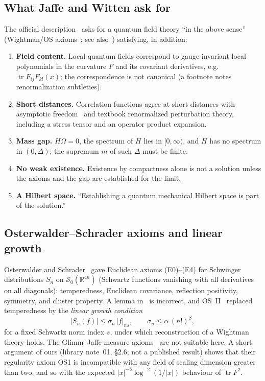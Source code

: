 \documentclass[11pt]{article}
\theoremstyle{definition}
\theoremstyle{remark}
\newcommand{\R}{\mathbb{R}}
\newcommand{\Sch}{\mathcal{S}}
\newcommand{\tr}{\operatorname{tr}}
\begin{document}
\subsection{What Jaffe and Witten ask for}
The official description~\cite{Jaffe2000} asks for a quantum field theory ``in the above sense''
(Wightman/OS axioms~\cite{Streater1964,Osterwalder1973,Osterwalder1975}; see
also~\cite{Glimm1987,Haag1996}) satisfying, in addition:
\begin{enumerate}[leftmargin=*]
\item \textbf{Field content.} Local quantum fields correspond to gauge-invariant local polynomials
  in the curvature $F$ and its covariant derivatives, e.g.\ $\tr F_{ij}F_{kl}(x)$; the
  correspondence is not canonical (a footnote notes renormalization subtleties).
\item \textbf{Short distances.} Correlation functions agree at short distances with asymptotic
  freedom~\cite{Gross1973,Politzer1973} and textbook renormalized perturbation theory, including
  a stress tensor and an operator product expansion.
\item \textbf{Mass gap.} $H\Omega=0$, the spectrum of $H$ lies in $[0,\infty)$, and $H$ has no
  spectrum in $(0,\Delta)$; the supremum $m$ of such $\Delta$ must be finite.
\item \textbf{No weak existence.} Existence by compactness alone is not a solution unless the
  axioms and the gap are established for the limit.
\item \textbf{A Hilbert space.} ``Establishing a quantum mechanical Hilbert space is part of the
  solution.''
\end{enumerate}

\subsection{Osterwalder--Schrader axioms and linear growth}
Osterwalder and Schrader~\cite{Osterwalder1973} gave Euclidean axioms (E0)--(E4) for Schwinger
distributions $S_n$ on $\Sch_0(\R^{4n})$ (Schwartz functions vanishing with all derivatives on
all diagonals): temperedness, Euclidean covariance, reflection positivity, symmetry, and cluster
property. A lemma in~\cite{Osterwalder1973} is incorrect, and OS~II~\cite{Osterwalder1975}
replaced temperedness by the \emph{linear growth condition}
\begin{equation}\label{eq:E0prime}
\tag{E0$'$}
|S_n(f)|\le \sigma_n\,|f|_{ns},\qquad \sigma_n\le\alpha\,(n!)^\beta,
\end{equation}
for a fixed Schwartz norm index $s$, under which reconstruction of a Wightman theory holds. The
Glimm--Jaffe measure axioms~\cite{Glimm1987} are not suitable here. A short argument of ours (library
note~01, \S2.6; not a published result) shows that their regularity axiom OS1 is incompatible with any
field of scaling dimension greater than two, and so with the expected $|x|^{-8}\log^{-2}(1/|x|)$
behaviour of $\tr F^2$.
\end{document}
